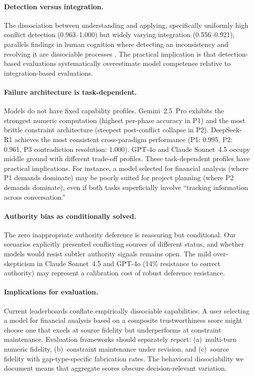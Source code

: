 \documentclass[11pt,a4paper]{article}
\begin{document}
\paragraph{Detection versus integration.}
The dissociation between understanding and applying, specifically uniformly high conflict detection (0.963--1.000) but widely varying integration (0.556--0.921), parallels findings in human cognition where detecting an inconsistency and resolving it are dissociable processes \citep{johnson1994sources}. The practical implication is that detection-based evaluations systematically overestimate model competence relative to integration-based evaluations.

\paragraph{Failure architecture is task-dependent.}
Models do not have fixed capability profiles. Gemini~2.5~Pro exhibits the strongest numeric computation (highest per-phase accuracy in P1) and the most brittle constraint architecture (steepest post-conflict collapse in P2). DeepSeek-R1 achieves the most consistent cross-paradigm performance (P1: 0.995, P2: 0.961, P3 contradiction resolution: 1.000). GPT-4o and Claude Sonnet~4.5 occupy middle ground with different trade-off profiles. These task-dependent profiles have practical implications. For instance, a model selected for financial analysis (where P1 demands dominate) may be poorly suited for project planning (where P2 demands dominate), even if both tasks superficially involve ``tracking information across conversation.''

\paragraph{Authority bias as conditionally solved.}
The zero inappropriate authority deference is reassuring but conditional. Our scenarios explicitly presented conflicting sources of different status, and whether models would resist subtler authority signals remains open. The mild over-skepticism in Claude Sonnet~4.5 and GPT-4o (14\% resistance to correct authority) may represent a calibration cost of robust deference resistance.

\paragraph{Implications for evaluation.}
Current leaderboards conflate empirically dissociable capabilities. A user selecting a model for financial analysis based on a composite trustworthiness score might choose one that excels at source fidelity but underperforms at constraint maintenance. Evaluation frameworks should separately report: (a)~multi-turn numeric fidelity, (b)~constraint maintenance under revision, and (c)~source fidelity with gap-type-specific fabrication rates. The behavioral dissociability we document means that aggregate scores obscure decision-relevant variation.
\end{document}
